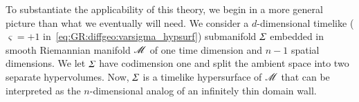 To substantiate the applicability of this theory, we begin in a more general picture than what we eventually will need. We consider a $d$-dimensional timelike ($\varsigma = +1$ in~\cref{eq:GR:diffgeo:varsigma_hypsurf}) submanifold $\varSigma$ embedded in smooth Riemannian manifold $\mathscr{M}$ of one time dimension and $n-1$ spatial dimensions. 
We let $\varSigma$ have codimension one and split the ambient space into two separate hypervolumes. Now, $\varSigma$ is a timelike hypersurface of $\mathscr{M}$ that can be interpreted as the $n$-dimensional analog of an infinitely thin domain wall.%


















